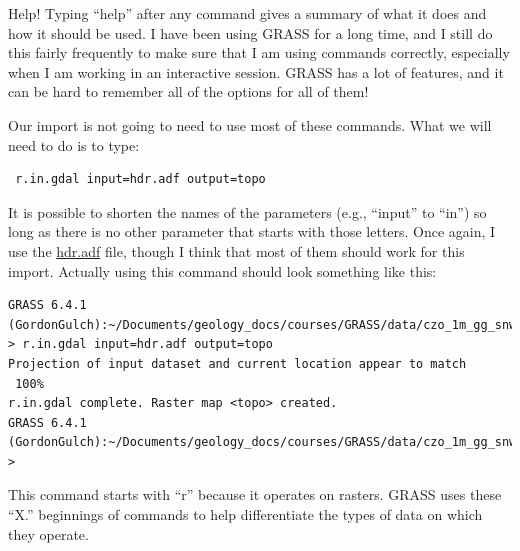 \documentclass{book}
\begin{document}
\begin{boxx}[!ht]
\begin{bclogo}[arrondi = 0.1, logo = \bcrosevents]{Help!}
Typing ``help'' after any command gives a summary of what it does and how it should be used. I have been using GRASS for a long time, and I still do this fairly frequently to make sure that I am using commands correctly, especially when I am working in an interactive session. GRASS has a lot of features, and it can be hard to remember all of the options for all of them!
\end{bclogo}
\caption{Help!}
\end{boxx}

Our import is not going to need to use most of these commands. What we will need to do is to type:
\begin{lstlisting}
 r.in.gdal input=hdr.adf output=topo
\end{lstlisting}
It is possible to shorten the names of the parameters (e.g., ``input'' to ``in'') so long as there is no other parameter that starts with those letters. Once again, I use the \url{hdr.adf} file, though I think that most of them should work for this import. Actually using this command should look something like this:
\begin{lstlisting}
GRASS 6.4.1 (GordonGulch):~/Documents/geology_docs/courses/GRASS/data/czo_1m_gg_snwOff/czo_1m_gg > r.in.gdal input=hdr.adf output=topo
Projection of input dataset and current location appear to match
 100%
r.in.gdal complete. Raster map <topo> created.
GRASS 6.4.1 (GordonGulch):~/Documents/geology_docs/courses/GRASS/data/czo_1m_gg_snwOff/czo_1m_gg > 
\end{lstlisting}

This command starts with ``r'' because it operates on rasters. GRASS uses these ``X.'' beginnings of commands to help differentiate the types of data on which they operate.
\end{document}
